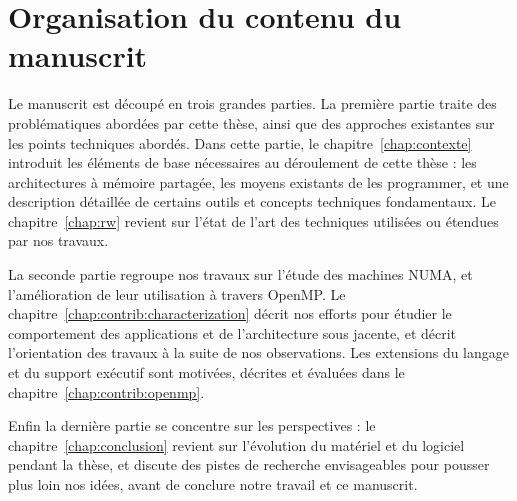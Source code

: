 \section{Organisation du contenu du manuscrit}\label{sec:intro:outline}

Le manuscrit est découpé en trois grandes parties.
La première partie traite des problématiques abordées par cette thèse, ainsi que des approches existantes sur les points techniques abordés.
Dans cette partie, le chapitre~\ref{chap:contexte} introduit les éléments de base nécessaires au déroulement de cette thèse : les architectures à mémoire partagée, les moyens existants de les programmer, et une description détaillée de certains outils et concepts techniques fondamentaux.
Le chapitre~\ref{chap:rw} revient sur l'état de l'art des techniques utilisées ou étendues par nos travaux.

La seconde partie regroupe nos travaux sur l'étude des machines NUMA, et l'amélioration de leur utilisation à travers OpenMP.
Le chapitre~\ref{chap:contrib:characterization} décrit nos efforts pour étudier le comportement des applications et de l'architecture sous jacente, et décrit l'orientation des travaux à la suite de nos observations.
Les extensions du langage et du support exécutif sont motivées, décrites et évaluées dans le chapitre~\ref{chap:contrib:openmp}.

Enfin la dernière partie se concentre sur les perspectives : le chapitre~\ref{chap:conclusion} revient sur l'évolution du matériel et du logiciel pendant la thèse, et discute des pistes de recherche envisageables pour pousser plus loin nos idées, avant de conclure notre travail et ce manuscrit.
